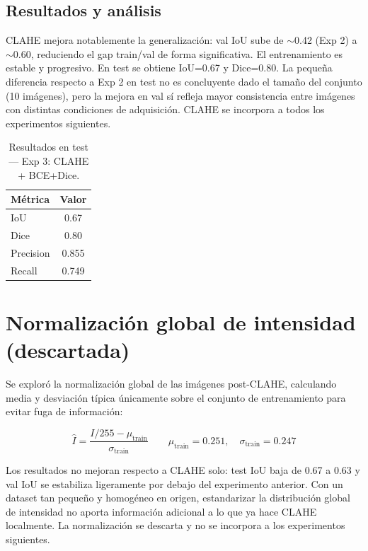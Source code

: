 \documentclass[12pt,a4paper]{article}
\begin{document}
\subsection{Resultados y análisis}

CLAHE mejora notablemente la generalización: val IoU sube de $\sim$0.42 (Exp 2) a $\sim$0.60, reduciendo el gap train/val de forma significativa. El entrenamiento es estable y progresivo. En test se obtiene IoU=0.67 y Dice=0.80. La pequeña diferencia respecto a Exp 2 en test no es concluyente dado el tamaño del conjunto (10 imágenes), pero la mejora en val sí refleja mayor consistencia entre imágenes con distintas condiciones de adquisición. CLAHE se incorpora a todos los experimentos siguientes.

\begin{table}[H]
\centering
\caption{Resultados en test — Exp 3: CLAHE + BCE+Dice.}
\label{tab:exp3}
\begin{tabular}{lc}
\toprule
Métrica & Valor \\
\midrule
IoU       & 0.67 \\
Dice      & 0.80 \\
Precision &  0.855\\
Recall    &  0.749\\
\bottomrule
\end{tabular}
\end{table}

\section{Normalización global de intensidad (descartada)}

Se exploró la normalización global de las imágenes post-CLAHE, calculando media y desviación típica únicamente sobre el conjunto de entrenamiento para evitar fuga de información:

\begin{equation}
    \hat{I} = \frac{I/255 - \mu_{\text{train}}}{\sigma_{\text{train}}}
    \qquad \mu_{\text{train}} = 0.251, \quad \sigma_{\text{train}} = 0.247
\end{equation}

Los resultados no mejoran respecto a CLAHE solo: test IoU baja de 0.67 a 0.63 y val IoU se estabiliza ligeramente por debajo del experimento anterior. Con un dataset tan pequeño y homogéneo en origen, estandarizar la distribución global de intensidad no aporta información adicional a lo que ya hace CLAHE localmente. La normalización se descarta y no se incorpora a los experimentos siguientes.
\end{document}
